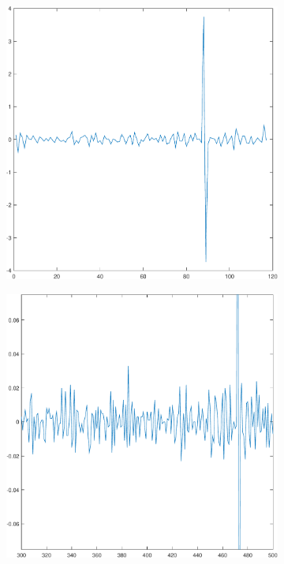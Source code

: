 \documentclass[sigconf]{acmart}
\begin{document}
	\begin{figure}[!htp]
		\centering
		\begin{subfigure}[t]{0.4\linewidth}
			\centering
			\includegraphics[width=0.95\linewidth, trim={100 100 0 0}, clip=true]{fig/RTT_8}
			\label{fig:3.3a}
		\end{subfigure}
		\begin{subfigure}[t]{0.4\linewidth}
			\centering
			\includegraphics[width=0.95\linewidth, trim={100 100 0 0}, clip]{fig/RTT_20}

\end{subfigure}
\end{figure}
\end{document}
